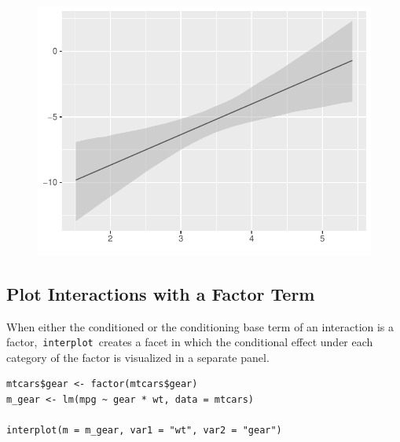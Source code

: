 \documentclass[
  article]{jss}
\begin{document}
\begin{figure}[H]

{\centering \includegraphics{jss_manuscript_files/figure-pdf/unnamed-chunk-9-1.pdf}

}

\end{figure}

\hypertarget{plot-interactions-with-a-factor-term}{%
\subsection{Plot Interactions with a Factor
Term}\label{plot-interactions-with-a-factor-term}}

When either the conditioned or the conditioning base term of an
interaction is a factor,~\texttt{interplot}~creates a facet in which the
conditional effect under each category of the factor is visualized in a
separate panel.

\begin{verbatim}
mtcars$gear <- factor(mtcars$gear)
m_gear <- lm(mpg ~ gear * wt, data = mtcars)

interplot(m = m_gear, var1 = "wt", var2 = "gear")
\end{verbatim}
\end{document}

